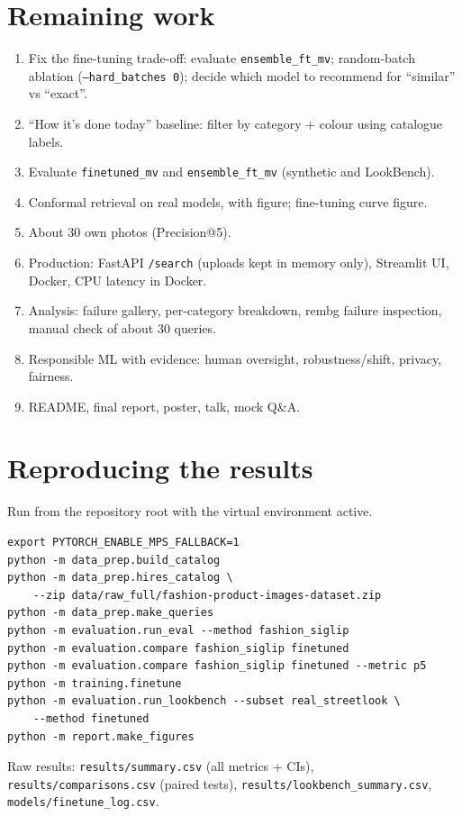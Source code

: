 \documentclass[11pt,a4paper]{article}
\begin{document}
\section{Remaining work}
\begin{enumerate}
  \item Fix the fine-tuning trade-off: evaluate \texttt{ensemble\_ft\_mv}; random-batch ablation
        (\texttt{--hard\_batches 0}); decide which model to recommend for ``similar'' vs ``exact''.
  \item ``How it's done today'' baseline: filter by category + colour using catalogue labels.
  \item Evaluate \texttt{finetuned\_mv} and \texttt{ensemble\_ft\_mv} (synthetic and LookBench).
  \item Conformal retrieval on real models, with figure; fine-tuning curve figure.
  \item About 30 own photos (Precision@5).
  \item Production: FastAPI \texttt{/search} (uploads kept in memory only), Streamlit UI, Docker,
        CPU latency in Docker.
  \item Analysis: failure gallery, per-category breakdown, rembg failure inspection, manual check of
        about 30 queries.
  \item Responsible ML with evidence: human oversight, robustness/shift, privacy, fairness.
  \item README, final report, poster, talk, mock Q\&A.
\end{enumerate}

\appendix
\section{Reproducing the results}
Run from the repository root with the virtual environment active.
\begin{verbatim}
export PYTORCH_ENABLE_MPS_FALLBACK=1
python -m data_prep.build_catalog
python -m data_prep.hires_catalog \
    --zip data/raw_full/fashion-product-images-dataset.zip
python -m data_prep.make_queries
python -m evaluation.run_eval --method fashion_siglip
python -m evaluation.compare fashion_siglip finetuned
python -m evaluation.compare fashion_siglip finetuned --metric p5
python -m training.finetune
python -m evaluation.run_lookbench --subset real_streetlook \
    --method finetuned
python -m report.make_figures
\end{verbatim}
Raw results: \texttt{results/summary.csv} (all metrics + CIs), \texttt{results/comparisons.csv}
(paired tests), \texttt{results/lookbench\_summary.csv}, \texttt{models/finetune\_log.csv}.
\end{document}
